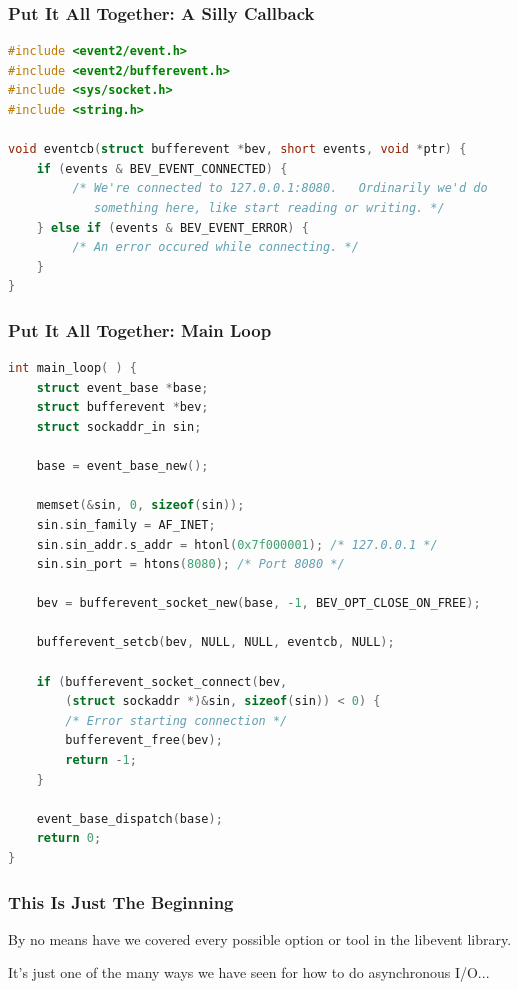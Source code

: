 \begin{frame}[fragile]
\frametitle{Put It All Together: A Silly Callback}


\begin{lstlisting}[language=C]
#include <event2/event.h>
#include <event2/bufferevent.h>
#include <sys/socket.h>
#include <string.h>

void eventcb(struct bufferevent *bev, short events, void *ptr) {
    if (events & BEV_EVENT_CONNECTED) {
         /* We're connected to 127.0.0.1:8080.   Ordinarily we'd do
            something here, like start reading or writing. */
    } else if (events & BEV_EVENT_ERROR) {
         /* An error occured while connecting. */
    }
}
\end{lstlisting}

\end{frame}

\begin{frame}[fragile]
\frametitle{Put It All Together: Main Loop}

\begin{lstlisting}[language=C]
int main_loop( ) {
    struct event_base *base;
    struct bufferevent *bev;
    struct sockaddr_in sin;

    base = event_base_new();

    memset(&sin, 0, sizeof(sin));
    sin.sin_family = AF_INET;
    sin.sin_addr.s_addr = htonl(0x7f000001); /* 127.0.0.1 */
    sin.sin_port = htons(8080); /* Port 8080 */

    bev = bufferevent_socket_new(base, -1, BEV_OPT_CLOSE_ON_FREE);

    bufferevent_setcb(bev, NULL, NULL, eventcb, NULL);

    if (bufferevent_socket_connect(bev,
        (struct sockaddr *)&sin, sizeof(sin)) < 0) {
        /* Error starting connection */
        bufferevent_free(bev);
        return -1;
    }

    event_base_dispatch(base);
    return 0;
}\end{lstlisting}

\end{frame}


\begin{frame}
\frametitle{This Is Just The Beginning}

By no means have we covered every possible option or tool in the libevent library.

It's just one of the many ways we have seen for how to do asynchronous I/O...


\end{frame}


